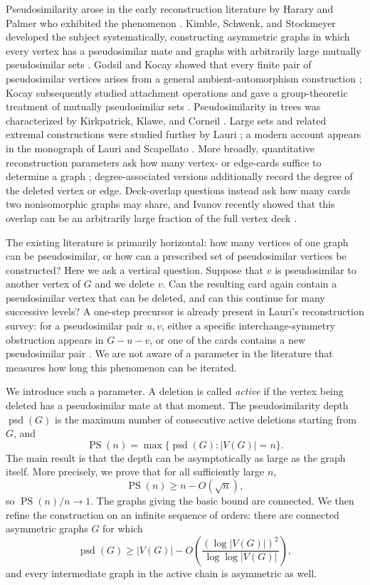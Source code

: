\documentclass[11pt]{article}
\theoremstyle{definition}
\theoremstyle{remark}
\newcommand{\psd}{\operatorname{psd}}
\newcommand{\PS}{\operatorname{PS}}
\begin{document}
Pseudosimilarity arose in the early reconstruction literature by Harary and Palmer who exhibited the phenomenon \cite{HararyPalmer1966}. Kimble, Schwenk, and Stockmeyer developed the subject systematically, constructing asymmetric graphs in which every vertex has a pseudosimilar mate and graphs with arbitrarily large mutually pseudosimilar sets \cite{KimbleSchwenkStockmeyer1981}. Godsil and Kocay showed that every finite pair of pseudosimilar vertices arises from a general ambient-automorphism construction \cite{GodsilKocay1982}; Kocay subsequently studied attachment operations and gave a group-theoretic treatment of mutually pseudosimilar sets \cite{KocayAttaching1984,Kocay1984}. Pseudosimilarity in trees was characterized by Kirkpatrick, Klawe, and Corneil \cite{KirkpatrickKlaweCorneil1983}. Large sets and related extremal constructions were studied further by Lauri \cite{Lauri1996,Lauri1997,Lauri2003}; a modern account appears in the monograph of Lauri and Scapellato \cite{LauriScapellato2016}. More broadly, quantitative reconstruction parameters ask how many vertex- or edge-cards suffice to determine a graph \cite{Lauri1993}; degree-associated versions additionally record the degree of the deleted vertex or edge. Deck-overlap questions instead ask how many cards two nonisomorphic graphs may share, and Ivanov recently showed that this overlap can be an arbitrarily large fraction of the full vertex deck \cite{Ivanov2026}.

The existing literature is primarily horizontal: how many vertices of one graph can be pseudosimilar, or how can a prescribed set of pseudosimilar vertices be constructed? Here we ask a vertical question. Suppose that $v$ is pseudosimilar to another vertex of $G$ and we delete $v$. Can the resulting card again contain a pseudosimilar vertex that can be deleted, and can this continue for many successive levels? A one-step precursor is already present in Lauri's reconstruction survey: for a pseudosimilar pair $u,v$, either a specific interchange-symmetry obstruction appears in $G-u-v$, or one of the cards contains a new pseudosimilar pair \cite{Lauri1993}. We are not aware of a parameter in the literature that measures how long this phenomenon can be iterated.

We introduce such a parameter. A deletion is called \emph{active} if the vertex being deleted has a pseudosimilar mate at that moment. The pseudosimilarity depth $\psd(G)$ is the maximum number of consecutive active deletions starting from $G$, and
\[
    \PS(n)=\max\{\psd(G): |V(G)|=n\}.
\]
The main result is that the depth can be asymptotically as large as the graph itself. More precisely, we prove that for all sufficiently large $n$,
\[
    \PS(n) \ge n-O(\sqrt n),
\]
so $\PS(n)/n\to1$. The graphs giving the basic bound are connected. We then refine the construction on an infinite sequence of orders: there are connected asymmetric graphs $G$ for which
\[
    \psd(G) \ge |V(G)|-
    O\!\left(\frac{(\log |V(G)|)^2}{\log\log |V(G)|}\right),
\]
and every intermediate graph in the active chain is asymmetric as well.
\end{document}
